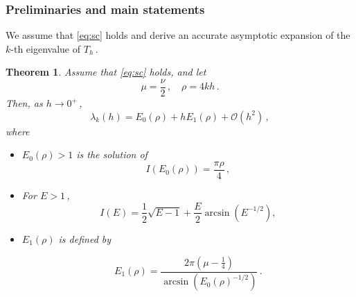 \documentclass[11pt]{amsart}
\numberwithin{equation}{section}
\newtheorem{theorem}{Theorem}[section]
\theoremstyle{remark}
\newcommand{\action}{I}
\begin{document}
\subsubsection{Preliminaries and main statements}
 We assume that \eqref{eq:sc} holds and derive an accurate asymptotic
 expansion of the $k$-th eigenvalue of $T_h\,$.



\begin{theorem}\label{thm-oscillatory-regime} 
Assume that \eqref{eq:sc} holds, and let 
\[\mu=\frac{\nu}{2}\,,\quad \rho=4kh\,.\]
Then, as $h\to0^+\,$,  
\[
\lambda_k(h)
=
E_0(\rho)
+
h E_1(\rho)
+
\mathcal O(h^2)\,,
\]
%
where  
\begin{itemize}
\item \(E_0(\rho)>1\) is the solution of
\[
\action(E_0(\rho))=\frac{\pi\rho}{4}\,,
\]
\item For $E>1$\,,
\[\action(E)
=
\frac12\sqrt{E-1}
+
\frac E2\arcsin(E^{-1/2}),\]
\item $E_1(\rho)$ is defined by 

	\[
	E_1(\rho)=
	\frac{2\pi\left(\mu-\frac14\right)}
	{\arcsin\left(E_0(\rho)^{-1/2}\right)}\,.
	\]
%	
\end{itemize}
\end{theorem}
\end{document}
